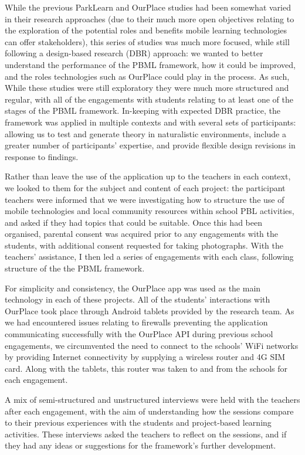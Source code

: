 While the previous ParkLearn and OurPlace studies had been somewhat varied in their research approaches (due to their much more open objectives relating to the exploration of the potential roles and benefits mobile learning technologies can offer stakeholders), this series of studies was much more focused, while still following a design-based research (DBR) approach: we wanted to better understand the performance of the PBML framework, how it could be improved, and the roles technologies such as OurPlace could play in the process. As such, While these studies were still exploratory they were much more structured and regular, with all of the engagements with students relating to at least one of the stages of the PBML framework. In-keeping with expected DBR practice, the framework was applied in multiple contexts and with several sets of participants: allowing us to test and generate theory in naturalistic environments, include a greater number of participants' expertise, and provide flexible design revisions in response to findings. 

Rather than leave the use of the application up to the teachers in each context, we looked to them for the subject and content of each project: the participant teachers were informed that we were investigating how to structure the use of mobile technologies and local community resources within school PBL activities, and asked if they had topics that could be suitable. Once this had been organised, parental consent was acquired prior to any engagements with the students, with additional consent requested for taking photographs. With the teachers' assistance, I then led a series of engagements with each class, following structure of the the PBML framework. 

For simplicity and consistency, the OurPlace app was used as the main technology in each of these projects. All of the students' interactions with OurPlace took place through Android tablets provided by the research team. As we had encountered issues relating to firewalls preventing the application communicating successfully with the OurPlace API during previous school engagements, we circumvented the need to connect to the schools' WiFi networks by providing Internet connectivity by supplying a wireless router and 4G SIM card. Along with the tablets, this router was taken to and from the schools for each engagement.

A mix of semi-structured and unstructured interviews were held with the teachers after each engagement, with the aim of understanding how the sessions compare to their previous experiences with the students and project-based learning activities. These interviews asked the teachers to reflect on the sessions, and if they had any ideas or suggestions for the framework's further development.

